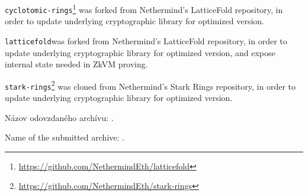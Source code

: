 \par \texttt{cyclotomic-rings}\footnote{\url{https://github.com/NethermindEth/latticefold}}
was forked from Nethermind's LatticeFold repository, in order to update underlying
cryptographic library for optimized version.
\par \texttt{latticefold}\footnotemark[1]
was forked from Nethermind's LatticeFold repository, in order to update underlying
cryptographic library for optimized version, and expose internal state needed in ZkVM proving.
\par \texttt{stark-rings}\footnote{\url{https://github.com/NethermindEth/stark-rings}}
was cloned from Nethermind's Stark Rings repository, in order to update underlying
cryptographic library for optimized version.

\ifx\FIITlagEN\undefined
	\par Názov odovzdaného archívu: \FIITArchiveName.
\else
	\par Name of the submitted archive: \FIITArchiveName.
\fi
